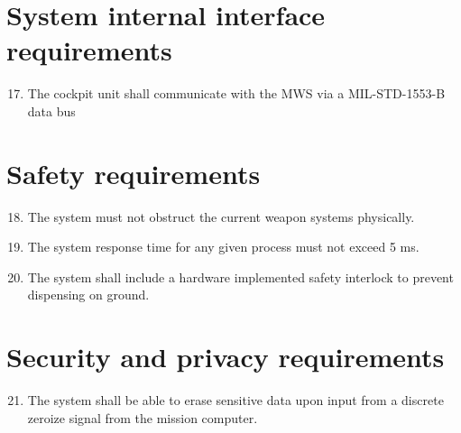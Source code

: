 \documentclass[Main]{subfiles}
\begin{document}
\section{System internal interface requirements}

\begin{enumerate}[{SR}-1]
\setcounter{enumi}{16}
\item The cockpit unit shall communicate with the MWS via a MIL-STD-1553-B data bus\label{SR-17}

\end{enumerate}


\section{Safety requirements}
\begin{enumerate}[{SR}-1.]
\setcounter{enumi}{17}
\item The system must not obstruct the current weapon systems physically.\label{SR-18}

\item The system response time for any given process must not exceed 5 ms.\label{SR-19}

\item The system shall include a hardware implemented safety interlock to prevent dispensing on ground.\label{SR-20}

\end{enumerate}


\section{Security and privacy requirements}

\begin{enumerate}[{SR}-1]
\setcounter{enumi}{20}
\item The system shall be able to erase sensitive data upon input from a discrete zeroize signal from the mission computer.\label{SR-21}

\end{enumerate}
\end{document}

